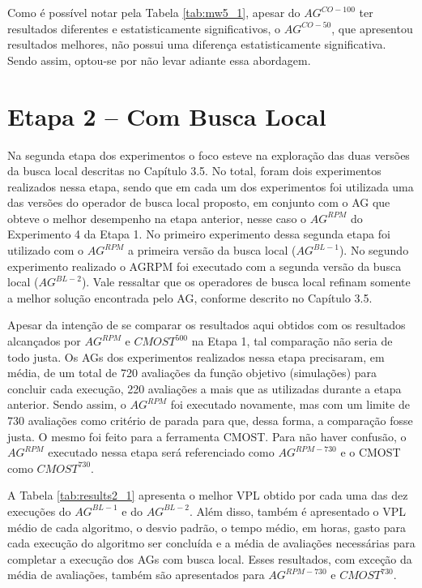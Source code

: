 Como é possível notar pela Tabela \ref{tab:mw5_1}, apesar do $AG^{CO-{100}}$ ter resultados diferentes e estatisticamente significativos, o $AG^{CO-{50}}$, que apresentou resultados melhores, não possui uma diferença estatisticamente significativa. Sendo assim, optou-se por não levar adiante essa abordagem.

\section{Etapa 2 – Com Busca Local}
\label{ch:5_Etapa2}
Na segunda etapa dos experimentos o foco esteve na exploração das duas versões da busca local descritas no Capítulo 3.5. No total, foram dois experimentos realizados nessa etapa, sendo que em cada um dos experimentos foi utilizada uma das versões do operador de busca local proposto, em conjunto com o AG que obteve o melhor desempenho na etapa anterior, nesse caso o $AG^{RPM}$ do Experimento 4 da Etapa 1. No primeiro experimento dessa segunda etapa foi utilizado com o $AG^{RPM}$ a primeira versão da busca local ($AG^{BL-1}$). No segundo experimento realizado o AGRPM foi executado com a segunda versão da busca local ($AG^{BL-2}$). Vale ressaltar que os operadores de busca local refinam somente a melhor solução encontrada pelo AG, conforme descrito no Capítulo 3.5.

Apesar da intenção de se comparar os resultados aqui obtidos com os resultados alcançados por $AG^{RPM}$ e  $CMOST^{500}$ na Etapa 1, tal comparação não seria de todo justa. Os AGs dos experimentos realizados nessa etapa precisaram, em média, de um total de 720 avaliações da função objetivo (simulações) para concluir cada execução, 220 avaliações a mais que as utilizadas durante a etapa anterior. Sendo assim, o $AG^{RPM}$ foi executado novamente, mas com um limite de 730 avaliações como critério de parada para que, dessa forma, a comparação fosse justa. O mesmo foi feito para a ferramenta CMOST. Para não haver confusão, o $AG^{RPM}$ executado nessa etapa será referenciado como $AG^{RPM-730}$ e o CMOST como $CMOST^{730}$. 

A Tabela \ref{tab:results2_1} apresenta o melhor VPL obtido por cada uma das dez execuções do $AG^{BL-1}$ e do $AG^{BL-2}$. Além disso, também é apresentado o VPL médio de cada algoritmo, o desvio padrão, o tempo médio, em horas, gasto para cada execução do algoritmo ser concluída e a média de avaliações necessárias para completar a execução dos AGs com busca local. Esses resultados, com exceção da média de avaliações, também são apresentados para $AG^{RPM-730}$ e $CMOST^{730}$.

